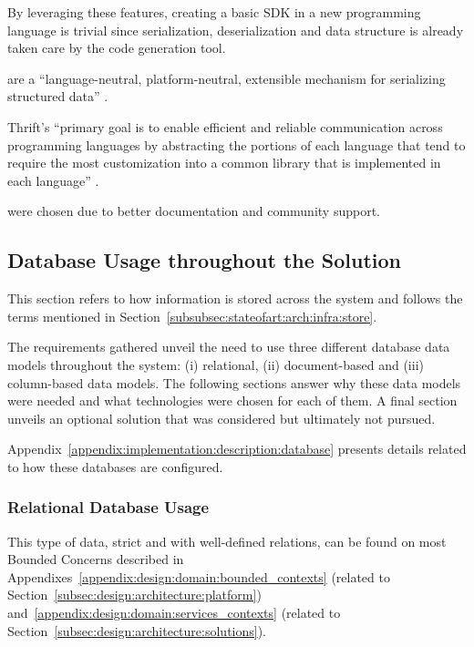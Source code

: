 By leveraging these features, creating a basic \gls{SDK} in a new programming language is trivial since serialization, deserialization and data structure is already taken care by the code generation tool.

 are a ``language-neutral, platform-neutral, extensible mechanism for serializing structured data'' \parencite{proto}.

Thrift's ``primary goal is to enable efficient and reliable communication across programming languages by abstracting the portions of each language that tend to require the most customization into a common library that is implemented in each language'' \parencite{thrift}.

 were chosen due to better documentation and community support.

\subsection{Database Usage throughout the Solution}
\label{subsec:implementation:decisions:database}

This section refers to how information is stored across the system and follows the terms mentioned in Section~\ref{subsubsec:stateofart:arch:infra:store}.

The requirements gathered unveil the need to use three different database data models throughout the system: (i) relational, (ii) document-based and (iii) column-based data models. The following sections answer why these data models were needed and what technologies were chosen for each of them. A final section unveils an optional solution that was considered but ultimately not pursued.

Appendix~\ref{appendix:implementation:description:database} presents details related to how these databases are configured.

\subsubsection{Relational Database Usage}
\label{subsubsec:implementation:decisions:database:relational}

This type of data, strict and with well-defined relations, can be found on most Bounded Concerns described in Appendixes~\ref{appendix:design:domain:bounded_contexts} (related to Section~\ref{subsec:design:architecture:platform}) and~\ref{appendix:design:domain:services_contexts} (related to Section~\ref{subsec:design:architecture:solutions}).

